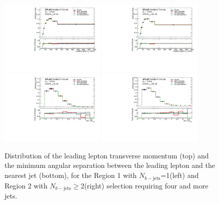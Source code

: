 \begin{figure}[!htb]
\centering
\includegraphics[width=0.45\textwidth]{Plots/ttV/shape/c_Region_0_lep_Pt_0}
\includegraphics[width=0.45\textwidth]{Plots/ttV/shape/c_Region_1_lep_Pt_0}\\
\includegraphics[width=0.45\textwidth]{Plots/ttV/shape/c_Region_0_min_DRl0j}
\includegraphics[width=0.45\textwidth]{Plots/ttV/shape/c_Region_1_min_DRl0j}\\
  \caption{Distribution of the leading lepton transverse momentum (top) and the minimum angular separation between the leading lepton and the nearest jet (bottom), for the Region 1 with $N_{b-\mathrm{jets}}$=1(left) and Region 2 with $N_{b-\mathrm{jets}}\geq$2(right) selection requiring four and more jets. 
  \label{ttV:lep_kin}}
\end{figure}

